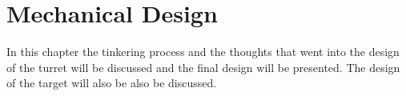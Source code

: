 \chapter{Mechanical Design}

In this chapter the tinkering process and the thoughts that went into the design
of the turret will be discussed and the final design will be presented. The design of the target will
also be also be discussed.


